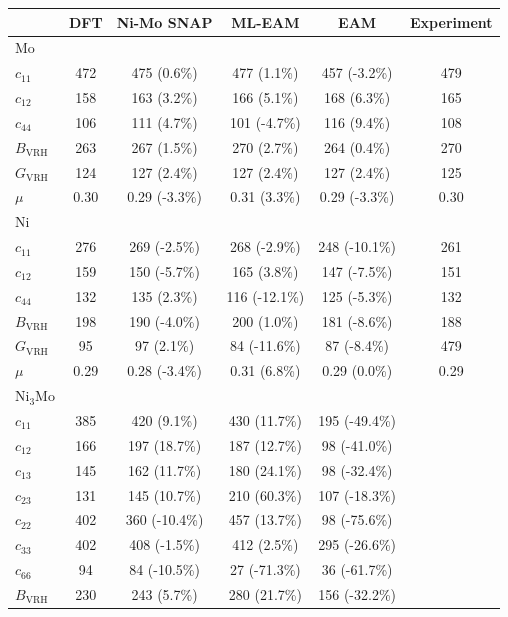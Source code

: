 \documentclass[prb,reprint]{revtex4-2}
\begin{document}
\begin{table}[h]
\centering
\begin{tabular}{lccccc}
\hline
    & DFT & Ni-Mo SNAP & ML-EAM & EAM & Experiment \\
\hline
Mo \\
$c_{11}$ & 472 & 475 (0.6\%) & 477 (1.1\%) & 457 (-3.2\%) & 479 \\
$c_{12}$ & 158 & 163 (3.2\%) & 166 (5.1\%) & 168 (6.3\%) & 165 \\
$c_{44}$ & 106 & 111 (4.7\%) & 101 (-4.7\%) & 116 (9.4\%) & 108 \\
$B_{\mathrm{VRH}}$ & 263 & 267 (1.5\%) & 270 (2.7\%) & 264 (0.4\%) & 270 \\
$G_{\mathrm{VRH}}$ & 124 & 127 (2.4\%) & 127 (2.4\%) & 127 (2.4\%) & 125 \\
$\mu$ & 0.30 & 0.29 (-3.3\%) & 0.31 (3.3\%) & 0.29 (-3.3\%) & 0.30 \\
\hline
Ni \\
$c_{11}$ & 276 & 269 (-2.5\%) & 268 (-2.9\%) & 248 (-10.1\%) & 261 \\
$c_{12}$ & 159 & 150 (-5.7\%) & 165 (3.8\%) & 147 (-7.5\%) & 151 \\
$c_{44}$ & 132 & 135 (2.3\%) & 116 (-12.1\%) & 125 (-5.3\%) & 132 \\
$B_{\mathrm{VRH}}$ & 198 & 190 (-4.0\%) & 200 (1.0\%) & 181 (-8.6\%) & 188 \\
$G_{\mathrm{VRH}}$ & 95 & 97 (2.1\%) & 84 (-11.6\%) & 87 (-8.4\%) & 479 \\
$\mu$ & 0.29 & 0.28 (-3.4\%) & 0.31 (6.8\%) & 0.29 (0.0\%) & 0.29 \\
\hline
Ni$_3$Mo \\
$c_{11}$ & 385 & 420 (9.1\%) & 430 (11.7\%) & 195 (-49.4\%) & \\
$c_{12}$ & 166 & 197 (18.7\%) & 187 (12.7\%) & 98 (-41.0\%) & \\
$c_{13}$ & 145 & 162 (11.7\%) & 180 (24.1\%) & 98 (-32.4\%) & \\
\color{blue} $c_{23}$ & 131 & 145 (10.7\%) & 210 (60.3\%) & 107 (-18.3\%) & \\
$c_{22}$ & 402 & 360 (-10.4\%) & 457 (13.7\%) & 98 (-75.6\%) & \\
\color{blue} $c_{33}$ & 402 & 408 (-1.5\%) & 412 (2.5\%) & 295 (-26.6\%) & \\
\color{blue} $c_{66}$ & 94 & 84 (-10.5\%) & 27 (-71.3\%) & 36 (-61.7\%) & \\
$B_{\mathrm{VRH}}$ & 230 & 243 (5.7\%) & 280 (21.7\%) & 156 (-32.2\%) &  \\

\end{tabular}
\end{table}
\end{document}
